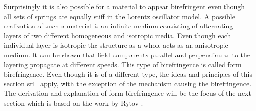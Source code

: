 Surprisingly it is also possible for a material to appear birefringent even though all sets of springs are equally stiff in the Lorentz oscillator model. A possible realization of such a material is an infinite medium consisting of alternating layers of two different homogeneous and isotropic media. Even though each individual layer is isotropic the structure as a whole acts as an anisotropic medium. It can be shown that field components parallel and perpendicular to the layering propagate at different speeds. This type of birefringence is called form birefringence. Even though it is of a different type, the ideas and principles of this section still apply, with the exception of the mechanism causing the birefringence. The derivation and explanation of form birefringence will be the focus of the next section which is based on the work by Rytov \cite{Rytov1956}. 

